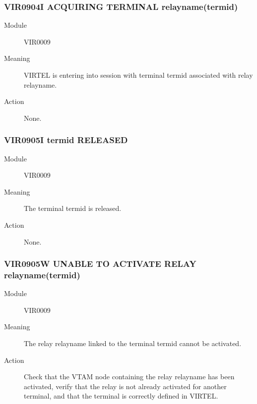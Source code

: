 \documentclass[letterpaper,10pt,english]{sphinxmanual}
\begin{document}
\subsubsection{VIR0904I ACQUIRING TERMINAL relayname(termid)}
\label{\detokenize{messages:vir0904i-acquiring-terminal-relayname-termid}}\begin{description}
\item[{Module}] \leavevmode
VIR0009

\item[{Meaning}] \leavevmode
VIRTEL is entering into session with terminal termid associated with relay relayname.

\item[{Action}] \leavevmode
None.

\end{description}


\subsubsection{VIR0905I termid RELEASED}
\label{\detokenize{messages:vir0905i-termid-released}}\begin{description}
\item[{Module}] \leavevmode
VIR0009

\item[{Meaning}] \leavevmode
The terminal termid is released.

\item[{Action}] \leavevmode
None.

\end{description}


\subsubsection{VIR0905W UNABLE TO ACTIVATE RELAY relayname(termid)}
\label{\detokenize{messages:vir0905w-unable-to-activate-relay-relayname-termid}}\begin{description}
\item[{Module}] \leavevmode
VIR0009

\item[{Meaning}] \leavevmode
The relay relayname linked to the terminal termid cannot be activated.

\item[{Action}] \leavevmode
Check that the VTAM node containing the relay relayname has been activated, verify that the relay is not already activated for another terminal, and that the terminal is correctly defined in VIRTEL.

\end{description}
\end{document}
